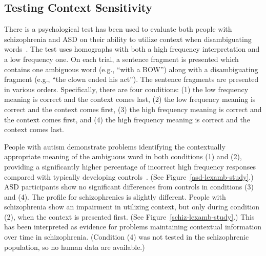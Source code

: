 \subsection{Testing Context Sensitivity}
There is a psychological test has been used to evaluate both people with schizophrenia and ASD on their ability to utilize context when disambiguating words~\cite{CohenJD:1992:Schizophrenia,HappeF:1997:WCC_Homographs}. The test uses homographs with both a high frequency interpretation and a low frequency one. On each trial, a sentence fragment is presented which contains one ambiguous word (e.g., ``with a BOW'') along with a disambiguating fragment (e.g., ``the clown ended his act''). The sentence fragments are presented in various orders. Specifically, there are four conditions: (1) the low frequency meaning is correct and the context comes last, (2) the low frequency meaning is correct and the context comes first, (3) the high frequency meaning is correct and the context comes first, and (4) the high frequency meaning is correct and the context comes last.

People with autism demonstrate problems identifying the contextually appropriate meaning of the ambiguous word in both conditions (1) and (2), providing a significantly higher percentage of incorrect high frequency responses compared with typically developing controls~\cite{HappeF:1997:WCC_Homographs}. (See Figure~\ref{asd-lexamb-study}.) ASD participants show no significant differences from controls in conditions (3) and (4). The profile for schizophrenics is slightly different. People with schizophrenia show an impairment in utilizing context, but only during condition (2), when the context is presented first. (See Figure~\ref{schiz-lexamb-study}.) This has been interpreted as evidence for problems maintaining contextual information over time in schizophrenia. (Condition (4) was not tested in the schizophrenic population, so no human data are available.)

